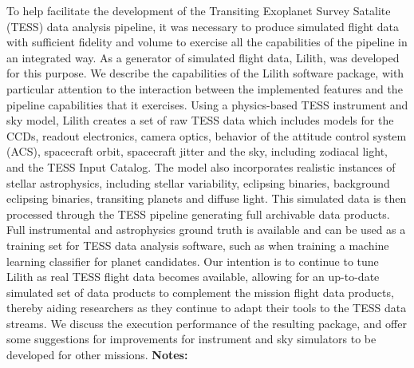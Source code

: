 \documentclass{report}
\begin{document}
{{{{{{{{{{{{{{{{{{{{{{{{{{{{{{{{{{{{{{{{{{{{{{{{{{{{{{{{{{{{{{{{{{{{{{{{{{{{{{{{{{{{{{{{{{{{{{{{{{{{{{{{{{{{{{{{{{{{{{{{{{{{{{{{{{{{{{{{{{{{{{{{{{{{{{{{{{{{{{{{{{{{{{{{{To help facilitate the development of the Transiting Exoplanet Survey Satalite (TESS) data analysis pipeline, it was necessary to produce simulated flight data with sufficient fidelity and volume to exercise all the capabilities of the pipeline in an integrated way. As a generator of simulated flight data, Lilith, was developed for this purpose. We describe the capabilities of the Lilith software package, with particular attention to the interaction between the implemented features and the pipeline capabilities that it exercises.  Using a physics-based TESS instrument and sky model, Lilith creates a set of raw TESS data which includes models for the CCDs, readout electronics, camera optics, behavior of the attitude control system (ACS), spacecraft orbit, spacecraft jitter and the sky, including zodiacal light, and the TESS Input Catalog. The model also incorporates realistic instances of stellar astrophysics, including stellar variability, eclipsing binaries, background eclipsing binaries, transiting planets and diffuse light. This simulated data is then processed through the TESS pipeline generating full archivable data products. Full instrumental and astrophysics ground truth is available and can be used as a training set for TESS data analysis software, such as when training a machine learning classifier for planet candidates. Our intention is to continue to tune Lilith as real TESS flight data becomes available, allowing for an up-to-date simulated set of data products to complement the mission flight data products, thereby aiding researchers as they continue to adapt their tools to the TESS data streams. We discuss the execution performance of the resulting package, and offer some suggestions for improvements for instrument and sky simulators to be developed for other missions.\newline
{\bf Notes:}\newline
{\newpage
}}}}}}}}}}}}}}}}}}}}}}}}}}}}}}}}}}}}}}}}}}}}}}}}}}}}}}}}}}}}}}}}}}}}}}}}}}}}}}}}}}}}}}}}}}}}}}}}}}}}}}}}}}}}}}}}}}}}}}}}}}}}}}}}}}}}}}}}}}}}}}}}}}}}}}}}}}}}}}}}}}}}}}}}}}
\end{document}
